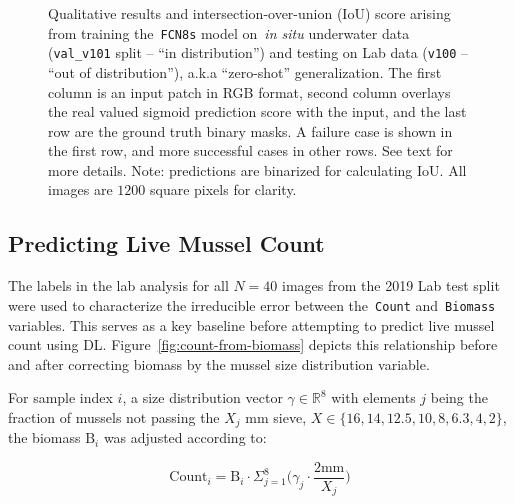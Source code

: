 \documentclass[11pt]{article} %
\begin{document}
\begin{figure}
\centering
{}

\caption{Qualitative results and intersection-over-union (IoU) score arising
from training the~\texttt{FCN8s} model on~\emph{in situ} underwater data
(\texttt{val\_v101} split -- ``in distribution'') and testing on Lab data 
(\texttt{v100} -- ``out of distribution''), a.k.a ``zero-shot'' generalization. 
The first column is an input patch in RGB format, second column 
overlays the real valued sigmoid prediction score with the input, and the last 
row are the ground truth binary masks. A failure case is shown in the first
row, and more successful cases in other rows. See text for more details. 
Note: predictions are binarized for calculating IoU. All images are $1200$
square pixels for clarity.}
\label{fig:zero-shot-situ-lab}
\end{figure}


\subsection{Predicting Live Mussel Count}

The labels in the lab analysis for all $N=40$ images from the 2019 Lab test 
split were used to characterize the irreducible error between 
the~\texttt{Count} and~\texttt{Biomass} variables. This serves as a key
baseline before attempting to predict live mussel count using DL. 
Figure~\ref{fig:count-from-biomass} depicts this relationship before and after 
correcting biomass by the mussel size distribution variable. 

For sample index $i$, a size distribution vector $\gamma \in \mathbb{R}^8$ with 
elements $j$ being the fraction of mussels not passing the $X_j$ mm sieve, 
$X \in \{16, 14, 12.5, 10, 8, 6.3, 4, 2\}$, the biomass $\text{B}_i$ was 
adjusted according to:

\begin{equation} \label{eq:size-distribution}
\text{Count}_i = \text{B}_i \cdot \Sigma_{j=1}^8 \bigg( \gamma_j \cdot \frac{2 
\text{mm}}{X_j} \bigg)
\end{equation}
\end{document}
